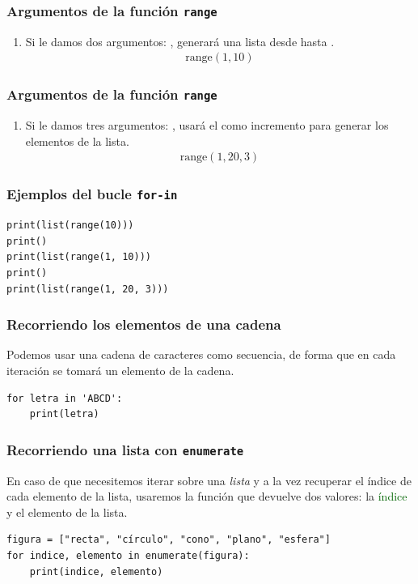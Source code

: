 \documentclass[12pt]{beamer}
\begin{document}
\begin{frame}
\frametitle{Argumentos de la función \texttt{range}}
\begin{enumerate}[<+->]
\conti    
\item Si le damos dos argumentos: , generará una lista desde  hasta .
\pause
\begin{align*}
\mbox{range}(1, 10)
\end{align*}
\seti
\end{enumerate}  
\end{frame}
\begin{frame}
\frametitle{Argumentos de la función \texttt{range}}
\begin{enumerate}[<+->]
\conti
\item Si le damos tres argumentos: \break \hfill {}, usará el  como incremento para generar los elementos de la lista.
\pause
\begin{align*}
\mbox{range}(1, 20, 3)
\end{align*}    
\end{enumerate}  
\end{frame}
\begin{frame}[fragile]
\frametitle{Ejemplos del bucle \texttt{for-in}}
\begin{lstlisting}[caption=Ejemplos con varios parámetros en la función range]
print(list(range(10)))
print()
print(list(range(1, 10)))
print()
print(list(range(1, 20, 3)))
\end{lstlisting}
\end{frame}
\begin{frame}[fragile]
\frametitle{Recorriendo los elementos de una cadena}
Podemos usar una cadena de caracteres como secuencia, de forma que en cada iteración se tomará un elemento de la cadena.
\pause
\begin{lstlisting}[caption=Recorriendo una cadena]
for letra in 'ABCD':
    print(letra)
\end{lstlisting}
\end{frame}
\begin{frame}[fragile]
\frametitle{Recorriendo una lista con \texttt{enumerate}}
En caso de que necesitemos iterar sobre una \emph{lista} y a la vez recuperar el índice de cada elemento de la lista, \pause usaremos la función  que devuelve dos valores: la \textcolor{darkgreen}{índice} y el \textcolor{lava}{elemento} de la lista.
\pause
\begin{lstlisting}[caption=Recorriendo con índices y elementos de una lista]
figura = ["recta", "círculo", "cono", "plano", "esfera"]
for indice, elemento in enumerate(figura):
    print(indice, elemento)
\end{lstlisting}
\end{frame}
\end{document}
